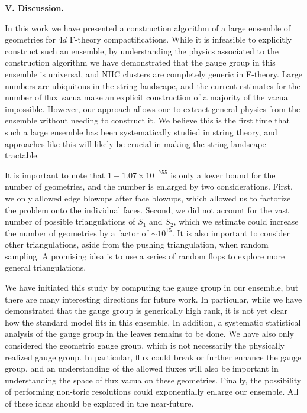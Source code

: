 \documentclass[aps,prl,twocolumn, superscriptaddress,groupedaddress,nofootinbib]{revtex4-1}
\begin{document}
\vspace{.2cm}
\noindent \textbf{V. Discussion.} 

In this work we have presented a construction algorithm of a large ensemble of geometries for $4d$ F-theory compactifications. While it is infeasible to explicitly construct such an ensemble, by understanding the physics associated to the construction algorithm we have demonstrated that the gauge group in this ensemble is universal, and NHC clusters are completely generic in F-theory. Large numbers are ubiquitous in the string landscape, and the current estimates for the number of flux vacua make an explicit construction of a majority of the vacua impossible. However, our approach allows one to extract general physics from the ensemble without needing to construct it. We believe this is the first time that such a large ensemble has been systematically studied in string theory, and approaches like this will likely be crucial in making the string landscape tractable. 

It is important to note that $1-1.07\times 10^{-755}$ is only a lower bound for the number of geometries, and the number is enlarged by two considerations. First, we only allowed edge blowups after face blowups, which allowed us to factorize the problem onto the individual faces. Second, we did not account for the vast number of possible triangulations of $S_1$ and $S_2$, which we estimate could increase the number of geometries by a factor of $\sim10^{15}$. It is also important to consider other triangulations, aside from the pushing triangulation, when random sampling. A promising idea is to use a series of random flops to explore more general triangulations.

We have initiated this study by computing the gauge group in our ensemble, but there are many interesting directions for future work. In particular, while we have demonstrated that the gauge group is generically high rank, it is not yet clear how the standard model fits in this ensemble. In addition, a systematic statistical analysis of the gauge group in the leaves remains to be done. We have also only considered the geometric gauge group, which is not necessarily the physically realized gauge group. In particular, flux could break or further enhance the gauge group, and an understanding of the allowed fluxes will also be important in understanding the space of flux vacua on these geometries. Finally, the possibility of performing non-toric resolutions could exponentially enlarge our ensemble. All of these ideas should be explored in the near-future.
\end{document}
